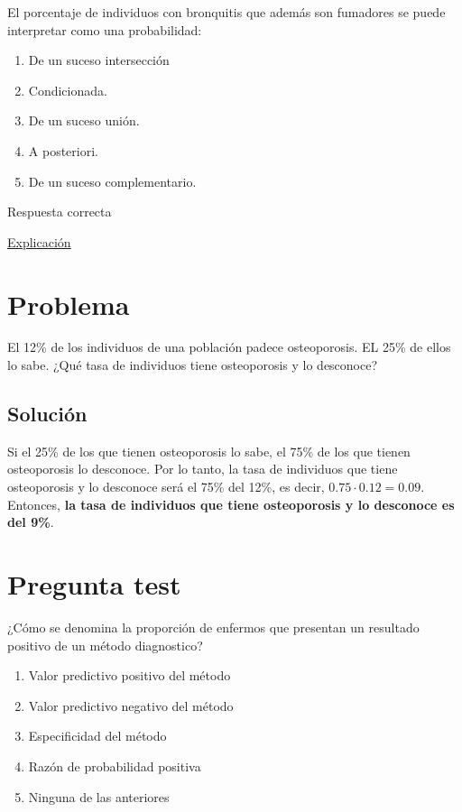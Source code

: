 \documentclass[
]{book}
\providecommand{\tightlist}{%
  \setlength{\itemsep}{0pt}\setlength{\parskip}{0pt}}
\begin{document}
El porcentaje de individuos con bronquitis que además son fumadores se puede interpretar como una probabilidad:

\begin{enumerate}
\def\labelenumi{\alph{enumi})}
\tightlist
\item
  De un suceso intersección
\item
  Condicionada.
\item
  De un suceso unión.
\item
  A posteriori.
\item
  De un suceso complementario.
\end{enumerate}

Respuesta correcta

\href{https://www.um.es/documents/4874468/11785083/tema-4.pdf/6d391656-5f98-49e4-b8b7-1d8d38767b7e}{Explicación}

\hypertarget{problema-15}{%
\section{Problema}\label{problema-15}}

El 12\% de los individuos de una población padece osteoporosis. EL 25\% de ellos lo sabe. ¿Qué tasa de individuos tiene osteoporosis y lo desconoce?

\hypertarget{soluciuxf3n-12}{%
\subsection{Solución}\label{soluciuxf3n-12}}

Si el 25\% de los que tienen osteoporosis lo sabe, el 75\% de los que tienen osteoporosis lo desconoce. Por lo tanto, la tasa de individuos que tiene osteoporosis y lo desconoce será el 75\% del 12\%, es decir, \(0.75 \cdot 0.12 = 0.09\). Entonces, \textbf{la tasa de individuos que tiene osteoporosis y lo desconoce es del 9\%}.

\hypertarget{pregunta-test-170}{%
\section{Pregunta test}\label{pregunta-test-170}}

¿Cómo se denomina la proporción de enfermos que presentan un resultado positivo de un método diagnostico?

\begin{enumerate}
\def\labelenumi{\alph{enumi})}
\tightlist
\item
  Valor predictivo positivo del método
\item
  Valor predictivo negativo del método
\item
  Especificidad del método
\item
  Razón de probabilidad positiva
\item
  Ninguna de las anteriores
\end{enumerate}
\end{document}
